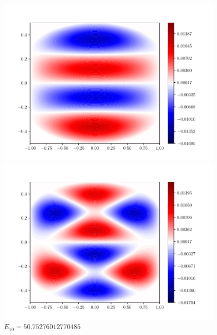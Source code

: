 \documentclass{article}
\begin{document}
\begin{enumerate}[1.]
\begin{enumerate}[(A)]
\begin{enumerate}[(i)]
\begin{figure}[H]
        \begin{minipage}{0.3\linewidth}
          \centering
          \includegraphics[width=\linewidth]{q6c-5.pdf}
          \caption*{$E_5= 26.818961595179772$}
        \end{minipage}
        \begin{minipage}{0.3\linewidth}
          \centering
          \includegraphics[width=\linewidth]{q6c-10.pdf}
          \caption*{$E_{10}= 50.75276012770485$}
        \end{minipage}
        \begin{minipage}{0.3\linewidth}
          \centering

\end{minipage}
\end{figure}
\end{enumerate}
\end{enumerate}
\end{enumerate}
\end{document}
